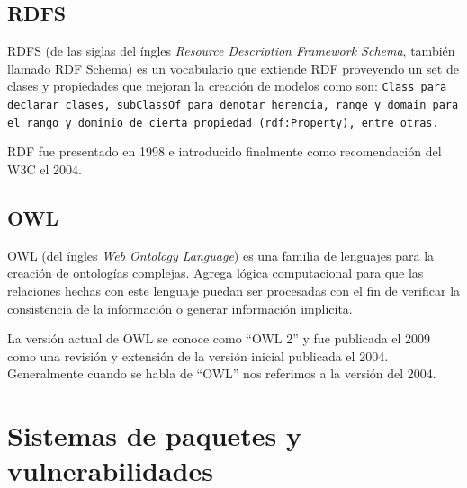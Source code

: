 \subsection{RDFS}
RDFS (de las siglas del íngles \emph{Resource Description Framework Schema},
también llamado RDF Schema) es un vocabulario que extiende RDF proveyendo un
set de clases y propiedades que mejoran la creación de modelos como son:
\tt{Class} para declarar clases, \tt{subClassOf} para denotar herencia,
\tt{range} y \tt{domain} para el rango y dominio de cierta propiedad
(\tt{rdf:Property}), entre otras.

RDF fue presentado en 1998 e introducido finalmente como recomendación del W3C
el 2004\cite{bikakis2013semantic}.

\subsection{OWL}
OWL (del íngles \emph{Web Ontology Language}) es una familia de lenguajes para
la creación de ontologías complejas.
Agrega lógica computacional para que las relaciones
hechas con este lenguaje puedan ser procesadas con el fin de verificar la
consistencia de la información o generar información implicita.

La versión actual de OWL se conoce como ``OWL 2'' y fue publicada el 2009 como 
una revisión y extensión de la versión inicial publicada el
2004\cite{bikakis2013semantic}. Generalmente cuando se habla de ``OWL'' nos
referimos a la versión del 2004.


\section{Sistemas de paquetes y vulnerabilidades}


